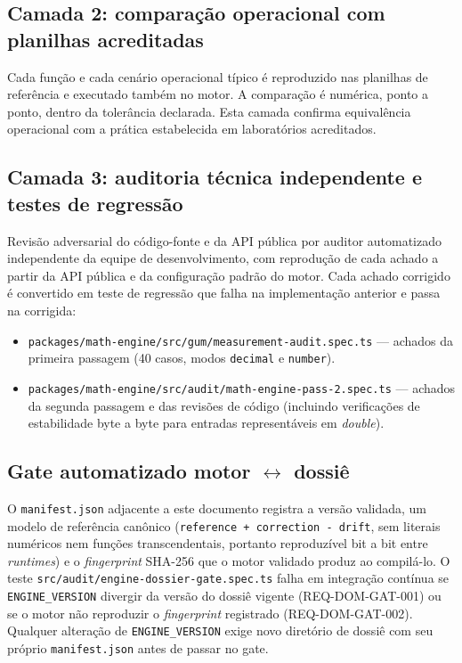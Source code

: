 \documentclass[11pt,a4paper]{article}
\begin{document}
\subsection{Camada 2: comparação operacional com planilhas acreditadas}

Cada função e cada cenário operacional típico é reproduzido nas planilhas de referência e executado também no motor. A comparação é numérica, ponto a ponto, dentro da tolerância declarada. Esta camada confirma equivalência operacional com a prática estabelecida em laboratórios acreditados.

\subsection{Camada 3: auditoria técnica independente e testes de regressão}

Revisão adversarial do código-fonte e da API pública por auditor automatizado independente da equipe de desenvolvimento, com reprodução de cada achado a partir da API pública e da configuração padrão do motor. Cada achado corrigido é convertido em teste de regressão que falha na implementação anterior e passa na corrigida:

\begin{itemize}
  \item \texttt{packages/math-engine/src/gum/measurement-audit.spec.ts} --- achados da primeira passagem (40 casos, modos \texttt{decimal} e \texttt{number}).
  \item \texttt{packages/math-engine/src/audit/math-engine-pass-2.spec.ts} --- achados da segunda passagem e das revisões de código (incluindo verificações de estabilidade byte a byte para entradas representáveis em \emph{double}).
\end{itemize}

\subsection{Gate automatizado motor \(\leftrightarrow\) dossiê}

O \texttt{manifest.json} adjacente a este documento registra a versão validada, um modelo de referência canônico (\texttt{reference + correction - drift}, sem literais numéricos nem funções transcendentais, portanto reproduzível bit a bit entre \emph{runtimes}) e o \emph{fingerprint} SHA-256 que o motor validado produz ao compilá-lo. O teste \texttt{src/audit/engine-dossier-gate.spec.ts} falha em integração contínua se \texttt{ENGINE\_VERSION} divergir da versão do dossiê vigente (REQ-DOM-GAT-001) ou se o motor não reproduzir o \emph{fingerprint} registrado (REQ-DOM-GAT-002). Qualquer alteração de \texttt{ENGINE\_VERSION} exige novo diretório de dossiê com seu próprio \texttt{manifest.json} antes de passar no gate.
\end{document}
